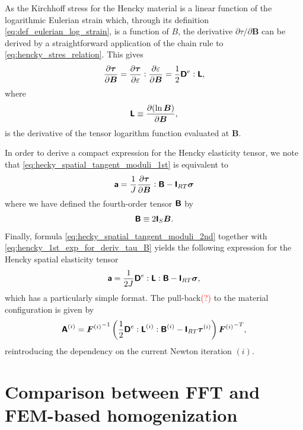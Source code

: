 As the Kirchhoff stress for the Hencky material is a linear function of the logarithmic Eulerian strain which, through its definition \eqref{eq:def_eulerian_log_strain}, is a function of \(B\), the derivative \(\partial \tau / \partial \boldsymbol{B}\) can be derived by a straightforward application of the chain rule to \eqref{eq:hencky_stres_relation}.
This gives
\begin{equation} \label{eq:hencky_1st_exp_for_deriv_tau_B}
\frac{\partial \boldsymbol{\tau}}{\partial \boldsymbol{B}}=\frac{\partial \boldsymbol{\tau}}{\partial \varepsilon}: \frac{\partial \varepsilon}{\partial \boldsymbol{B}}=\frac{1}{2} \boldsymbol{\mathsf{D}}^e: \boldsymbol{\mathsf{L}},
\end{equation}
where
\begin{equation}
\boldsymbol{\mathsf{L}} \equiv \frac{\partial(\ln \boldsymbol{B})}{\partial \boldsymbol{B}},
\end{equation}
is the derivative of the tensor logarithm function evaluated at \(\bm B\).

In order to derive a compact expression for the Hencky elasticity tensor, we note that \eqref{eq:hecky_spatial_tangent_moduli_1st} is equivalent to
\begin{equation} \label{eq:hecky_spatial_tangent_moduli_2nd}
\boldsymbol{\mathsf{a}}=\frac{1}{J}\frac{\partial \boldsymbol{\tau}}{\partial \boldsymbol{B}}: \boldsymbol{\mathsf{B}}-\boldsymbol{\mathsf{I}}_{RT}\bm\sigma
\end{equation}
where we have defined the fourth-order tensor \(\boldsymbol{\mathsf{B}}\) by
\begin{equation}
\boldsymbol{\mathsf{B}} \equiv 2\boldsymbol{\mathsf{I}}_S \bm B.
\end{equation}
Finally, formula \eqref{eq:hecky_spatial_tangent_moduli_2nd} together with \eqref{eq:hencky_1st_exp_for_deriv_tau_B} yields the following expression for the Hencky spatial elasticity tensor
\begin{equation}
\boldsymbol{\mathsf{a}}=\frac{1}{2 J}\boldsymbol{\mathsf{D}}^e: \boldsymbol{\mathsf{L}}: \boldsymbol{\mathsf{B}}-\boldsymbol{\mathsf{I}}_{RT}\bm\sigma,
\end{equation}
which has a particularly simple format.
The pull-back\textcolor{red}{(?)} to the material configuration is given by
\begin{equation}
  \boldsymbol{\mathsf{A}}^{(i)} = {\bm F^{(i)}}^{-1}\left(\frac{1}{2}\boldsymbol{\mathsf{D}}^e:{\boldsymbol{\mathsf{L}}}^{(i)}: {\boldsymbol{\mathsf{B}}}^{(i)} - \boldsymbol{\mathsf{I}}_{RT}\bm \tau^{(i)}\right){\bm F^{(i)}}^{-T},
\end{equation}
reintroducing the dependency on the current Newton iteration \((i)\).

\section{Comparison between FFT and FEM-based homogenization}


